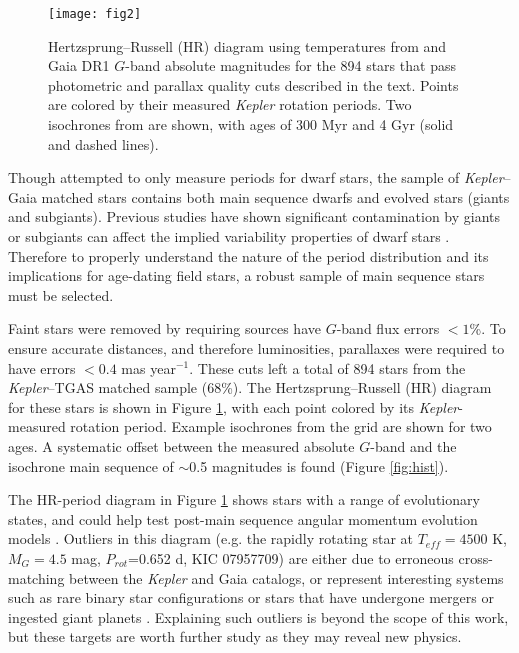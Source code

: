 \documentclass[manuscript, letterpaper]{aastex6}
\makeatletter
\let\origsection\section
\renewcommand\section{\@ifstar{\starsection}{\nostarsection}}
\newcommand\nostarsection[1]{\sectionprelude\origsection{#1}}
\newcommand\starsection[1]{\sectionprelude\origsection*{#1}}
\newcommand\sectionprelude{\vspace{1em}}
\newcommand{\Kepler}{\textsl{Kepler}\xspace}
\makeatother
\begin{document}
\begin{figure}[]
\centering
\texttt{[image: fig2]}
\caption{Hertzsprung--Russell (HR) diagram using temperatures from \citet{mcquillan2014} and Gaia DR1 $G$-band absolute magnitudes for the 894 stars that pass photometric and parallax quality cuts described in the text. Points are colored by their measured \Kepler rotation periods. Two isochrones from \citet{bressan2012} are shown, with ages of 300 Myr and 4 Gyr (solid and dashed lines).
}
\label{fig:HR}
\end{figure}

\section{Selecting Main Sequence Stars}

Though \citet{mcquillan2014} attempted to only measure periods for dwarf stars, the sample of \Kepler--Gaia matched stars contains both main sequence dwarfs and evolved stars (giants and subgiants). Previous studies have shown  significant contamination by giants or subgiants can affect the implied variability properties of dwarf stars \citep{ciardi2011,mann2012}. Therefore to properly understand the nature of the period distribution and its implications for age-dating field stars, a robust sample of main sequence stars must be selected.

Faint stars were removed by requiring sources have $G$-band flux errors $<1$\%. To ensure accurate distances, and therefore luminosities, parallaxes were required to have errors $<0.4$ mas year$^{-1}$. These cuts left a total of 894 stars from the \Kepler--TGAS matched sample (68\%). The Hertzsprung--Russell (HR) diagram for these stars is shown in Figure \ref{fig:HR}, with each point colored by its \Kepler-measured rotation period. Example isochrones from the \citet{bressan2012} grid are shown for two ages. A systematic offset between the measured absolute $G$-band and the isochrone main sequence of $\sim$0.5 magnitudes is found (Figure \ref{fig:hist}). 

The HR-period diagram in Figure \ref{fig:HR} shows stars with a range of evolutionary states, and could help test post-main sequence angular momentum evolution models \citep[e.g.][]{donascimento2012}. Outliers in this diagram (e.g. the rapidly rotating star at $T_{eff}=4500$ K, $M_G=4.5$ mag, $P_{rot}$=0.652 d, KIC 07957709) are either due to erroneous cross-matching between the \Kepler and Gaia catalogs, or represent interesting systems such as rare binary star configurations or stars that have undergone mergers or ingested giant planets \citep{massarotti2008,tayar2015}. Explaining such outliers is beyond the scope of this work, but these targets are worth further study as they may reveal new physics.
\end{document}

